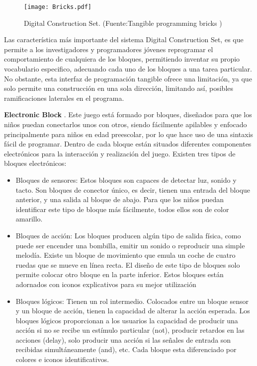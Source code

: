 \begin{figure}[!h]
\begin{center}
\texttt{[image: Bricks.pdf]}
\caption{Digital Construction Set. (Fuente:Tangible programming bricks \cite{McNerneyBricks})}
\label{fig:Bricks}
\end{center}
\end{figure}

Las característica más importante del sistema Digital Construction Set, es que permite a los investigadores y programadores jóvenes reprogramar el comportamiento de cualquiera de los bloques, permitiendo inventar su propio vocabulario especifico, adecuando cada uno de los bloques a una tarea particular.
No obstante, esta interfaz de programación tangible ofrece una limitación, ya que solo permite una construcción en una sola dirección, limitando así, posibles ramificaciones laterales en el programa.


\textbf{Electronic Block} \cite{Wyeth}. Este juego está formado por bloques, diseñados para que los niños puedan conectarlos unos con otros, siendo fácilmente apilables y enfocado principalmente para niños en edad preescolar, por lo que hace uso de una sintaxis fácil de programar. Dentro de cada bloque están situados diferentes componentes electrónicos para la interacción y realización del juego.
Existen tres tipos de bloques electrónicos:
\begin{itemize}
\item Bloques de sensores: Estos bloques son capaces de detectar luz, sonido y tacto. Son bloques de conector único, es decir, tienen una entrada del bloque anterior, y una salida al bloque de abajo. Para que los niños puedan identificar este tipo de bloque más fácilmente, todos ellos son de color amarillo.
\item Bloques de acción: Los bloques producen algún tipo de salida física, como puede ser encender una bombilla, emitir un sonido o reproducir una simple melodía. Existe un bloque de movimiento que emula un coche de cuatro ruedas que se mueve en línea recta.
El diseño de este tipo de bloques solo permite colocar otro bloque en la parte inferior. Estos bloques están adornados con iconos explicativos para su mejor utilización
\item Bloques lógicos:  Tienen un rol intermedio. Colocados entre un bloque sensor y un bloque de acción, tienen la capacidad de alterar la acción esperada. Los bloques lógicos proporcionan a los usuarios la capacidad de producir una acción si no se recibe un estímulo particular (not), producir retardos en las acciones (delay), solo producir una acción si las señales de entrada son recibidas simultáneamente (and), etc.
Cada bloque esta diferenciado por colores e iconos identificativos.
\end{itemize}

